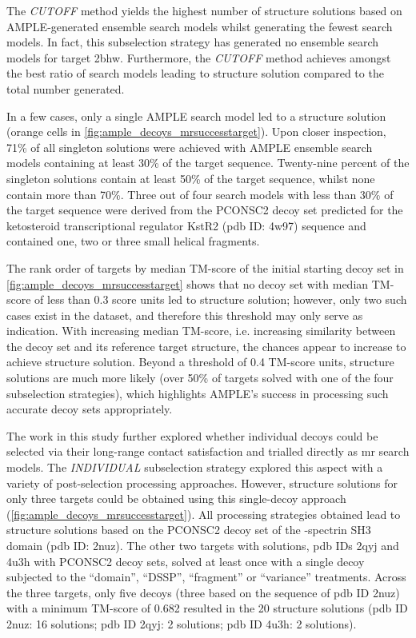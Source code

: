The \textit{CUTOFF} method yields the highest number of structure solutions based on AMPLE-generated ensemble search models whilst generating the fewest search models. In fact, this subselection strategy has generated no ensemble search models for target 2bhw. Furthermore, the \textit{CUTOFF} method achieves amongst the best ratio of search models leading to structure solution compared to the total number generated. 

In a few cases, only a single AMPLE search model led to a structure solution (orange cells in \cref{fig:ample_decoys_mrsuccesstarget}). Upon closer inspection, 71\% of all singleton solutions were achieved with AMPLE ensemble search models containing at least 30\% of the target sequence. Twenty-nine percent of the singleton solutions contain at least 50\% of the target sequence, whilst none contain more than 70\%. Three out of four search models with less than 30\% of the target sequence were derived from the PCONSC2 decoy set predicted for the ketosteroid transcriptional regulator KstR2 (\gls{pdb} ID: 4w97) sequence and contained one, two or three small helical fragments.  

The rank order of targets by median TM-score of the initial starting decoy set in \cref{fig:ample_decoys_mrsuccesstarget} shows that no decoy set with median TM-score of less than 0.3 score units led to structure solution; however, only two such cases exist in the dataset, and therefore this threshold may only serve as indication. With increasing median TM-score, i.e. increasing similarity between the decoy set and its reference target structure, the chances appear to increase to achieve structure solution. Beyond a threshold of 0.4 TM-score units, structure solutions are much more likely (over 50\% of targets solved with one of the four subselection strategies), which highlights AMPLE's success in processing such accurate decoy sets appropriately.

The work in this study further explored whether individual decoys could be selected via their long-range contact satisfaction and trialled directly as \gls{mr} search models. The \textit{INDIVIDUAL} subselection strategy explored this aspect with a variety of post-selection processing approaches. However, structure solutions for only three targets could be obtained using this single-decoy approach (\cref{fig:ample_decoys_mrsuccesstarget}). All processing strategies obtained lead to structure solutions based on the PCONSC2 decoy set of the \textalpha-spectrin SH3 domain (\gls{pdb} ID: 2nuz). The other two targets with solutions, \gls{pdb} IDs 2qyj and 4u3h with PCONSC2 decoy sets, solved at least once with a single decoy subjected to the ``domain'', ``DSSP'', ``fragment'' or ``variance'' treatments. Across the three targets, only five decoys (three based on the sequence of \gls{pdb} ID 2nuz) with a minimum TM-score of 0.682 resulted in the 20 structure solutions (\gls{pdb} ID 2nuz: 16 solutions; \gls{pdb} ID 2qyj: 2 solutions; \gls{pdb} ID 4u3h: 2 solutions).

